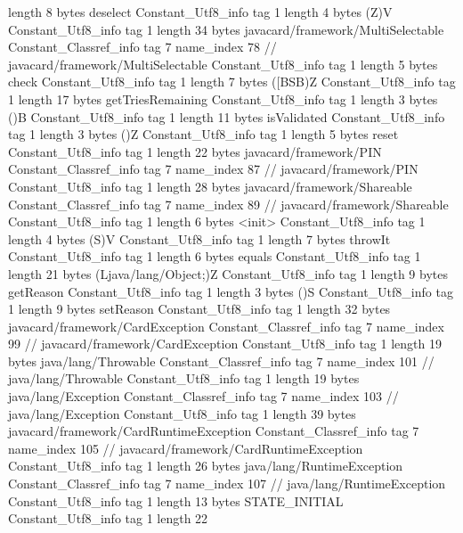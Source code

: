 {{{			length	8
			bytes	deselect
		}
		Constant_Utf8_info {
			tag	1
			length	4
			bytes	(Z)V
		}
		Constant_Utf8_info {
			tag	1
			length	34
			bytes	javacard/framework/MultiSelectable
		}
		Constant_Classref_info {
			tag	7
			name_index	78		// javacard/framework/MultiSelectable
		}
		Constant_Utf8_info {
			tag	1
			length	5
			bytes	check
		}
		Constant_Utf8_info {
			tag	1
			length	7
			bytes	([BSB)Z
		}
		Constant_Utf8_info {
			tag	1
			length	17
			bytes	getTriesRemaining
		}
		Constant_Utf8_info {
			tag	1
			length	3
			bytes	()B
		}
		Constant_Utf8_info {
			tag	1
			length	11
			bytes	isValidated
		}
		Constant_Utf8_info {
			tag	1
			length	3
			bytes	()Z
		}
		Constant_Utf8_info {
			tag	1
			length	5
			bytes	reset
		}
		Constant_Utf8_info {
			tag	1
			length	22
			bytes	javacard/framework/PIN
		}
		Constant_Classref_info {
			tag	7
			name_index	87		// javacard/framework/PIN
		}
		Constant_Utf8_info {
			tag	1
			length	28
			bytes	javacard/framework/Shareable
		}
		Constant_Classref_info {
			tag	7
			name_index	89		// javacard/framework/Shareable
		}
		Constant_Utf8_info {
			tag	1
			length	6
			bytes	<init>
		}
		Constant_Utf8_info {
			tag	1
			length	4
			bytes	(S)V
		}
		Constant_Utf8_info {
			tag	1
			length	7
			bytes	throwIt
		}
		Constant_Utf8_info {
			tag	1
			length	6
			bytes	equals
		}
		Constant_Utf8_info {
			tag	1
			length	21
			bytes	(Ljava/lang/Object;)Z
		}
		Constant_Utf8_info {
			tag	1
			length	9
			bytes	getReason
		}
		Constant_Utf8_info {
			tag	1
			length	3
			bytes	()S
		}
		Constant_Utf8_info {
			tag	1
			length	9
			bytes	setReason
		}
		Constant_Utf8_info {
			tag	1
			length	32
			bytes	javacard/framework/CardException
		}
		Constant_Classref_info {
			tag	7
			name_index	99		// javacard/framework/CardException
		}
		Constant_Utf8_info {
			tag	1
			length	19
			bytes	java/lang/Throwable
		}
		Constant_Classref_info {
			tag	7
			name_index	101		// java/lang/Throwable
		}
		Constant_Utf8_info {
			tag	1
			length	19
			bytes	java/lang/Exception
		}
		Constant_Classref_info {
			tag	7
			name_index	103		// java/lang/Exception
		}
		Constant_Utf8_info {
			tag	1
			length	39
			bytes	javacard/framework/CardRuntimeException
		}
		Constant_Classref_info {
			tag	7
			name_index	105		// javacard/framework/CardRuntimeException
		}
		Constant_Utf8_info {
			tag	1
			length	26
			bytes	java/lang/RuntimeException
		}
		Constant_Classref_info {
			tag	7
			name_index	107		// java/lang/RuntimeException
		}
		Constant_Utf8_info {
			tag	1
			length	13
			bytes	STATE_INITIAL
		}
		Constant_Utf8_info {
			tag	1
			length	22
}}}
